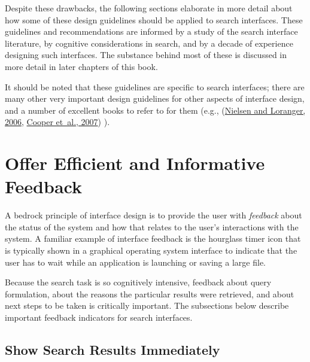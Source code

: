 \documentclass[sigconf,nonacm,screen,pbalance]{acmart}
\begin{document}
Despite these drawbacks, the following sections elaborate in more detail about how some of these design
guidelines should be applied to search interfaces. These guidelines and recommendations are informed by a
study of the search interface literature, by cognitive considerations in search, and by a decade of
experience designing such interfaces. The substance behind most of these is discussed in more detail in
later chapters of this book.

It should be noted that these guidelines are specific to search interfaces; there are many other very
important design guidelines for other aspects of interface design, and a number of excellent books to
refer to for them (e.g., (\href{https://searchuserinterfaces.com/book/sui_references.html#nielsen2006pwu}{Nielsen and Loranger, 2006}, \href{https://searchuserinterfaces.com/book/sui_references.html#cooper2007abt}{ Cooper et~al., 2007}) ).

\section{Offer Efficient and Informative Feedback}

A bedrock principle of interface design is to provide the user with {\em  feedback} about the status of
the system and how that relates to the user's interactions with the system. A familiar example of
interface feedback is the hourglass timer icon that is typically shown in a graphical operating system
interface to indicate that the user has to wait while an application is launching or saving a large file.

Because the search task is so cognitively intensive, feedback about query formulation, about the reasons
the particular results were retrieved, and about next steps to be taken is critically important. The
subsections below describe important feedback indicators for search interfaces.

\subsection{Show Search Results Immediately}
\end{document}
